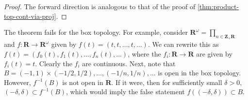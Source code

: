 \begin{proof}
The forward direction is analogous to that of the proof of
\cref{thm:product-top-cont-via-proj}.
\end{proof}
\begin{example}
The theorem fails for the box topology. For example, consider
$\mathbf{R}^{\omega} = \prod_{n \in \mathbf{Z_{+}} \mathbf{R}}$
and $f: \mathbf{R} \to \mathbf{R}^{\omega}$ given by
$f(t) = (t, t, \ldots, t, \ldots)$. We can rewrite this as
$f(t) = (f_{0}(t), f_{1}(t), \ldots, f_{n}(t), \ldots)$, where
the $f_i: \mathbf{R} \to \mathbf{R}$ are given by $f_{i}(t) = t$.
Clearly the $f_{i}$ are continuous. Next, note that
$B = (-1,1) \times (-1/2, 1/2), \ldots, (-1/n, 1/n), \ldots$ is open in the box
topology. However, $f^{-1}(B)$ is not open in $\mathbf{R}$.
If it were, then for sufficiently small $\delta > 0$, $(-\delta, \delta)
\subset f^{-1}(B)$, which would imply the false statement $f((-\delta, \delta))
\subset B$.
\end{example}
